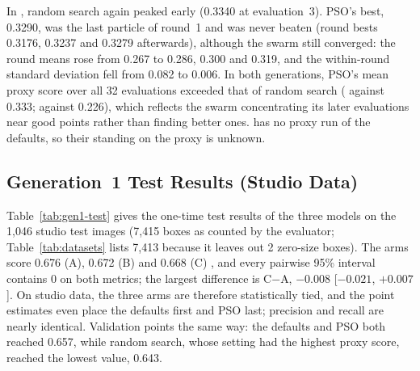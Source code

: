 In \gentwo, random search again peaked early (0.3340 at evaluation~3). PSO's best, 0.3290, was the last particle of round~1 and was never beaten (round bests 0.3176, 0.3237 and 0.3279 afterwards), although the swarm still converged: the round means rose from 0.267 to 0.286, 0.300 and 0.319, and the within-round standard deviation fell from 0.082 to 0.006. In both generations, PSO's mean proxy score over all 32 evaluations exceeded that of random search ( against 0.333;  against 0.226), which reflects the swarm concentrating its later evaluations near good points rather than finding better ones. \gentwo has no proxy run of the defaults, so their standing on the \gentwo proxy is unknown.

\subsection{Generation~1 Test Results (Studio Data)}
\label{subsec:res-gen1}

Table~\ref{tab:gen1-test} gives the one-time test results of the three \genone models on the 1,046 studio test images (7,415 boxes as counted by the evaluator; Table~\ref{tab:datasets} lists 7,413 because it leaves out 2 zero-size boxes). The arms score 0.676 (A), 0.672 (B) and 0.668 (C) \mapfifty, and every pairwise 95\% interval contains 0 on both metrics; the largest difference is C$-$A, $-0.008$ [$-0.021$, $+0.007$]. On studio data, the three arms are therefore statistically tied, and the point estimates even place the defaults first and PSO last; precision and recall are nearly identical. Validation points the same way: the defaults and PSO both reached 0.657, while random search, whose setting had the highest \genone proxy score, reached the lowest value, 0.643.


